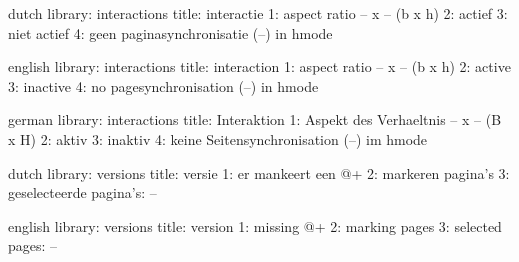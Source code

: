

\unprotect

\startmessages  dutch  library: interactions
  title: interactie
      1: aspect ratio -- x -- (b x h)
      2: actief
      3: niet actief
      4: geen paginasynchronisatie (--) in hmode
\stopmessages

\startmessages  english  library: interactions
  title: interaction
      1: aspect ratio -- x -- (b x h)
      2: active
      3: inactive
      4: no pagesynchronisation (--) in hmode
\stopmessages

\startmessages  german  library: interactions
  title: Interaktion
      1: Aspekt des Verhaeltnis -- x -- (B x H)
      2: aktiv
      3: inaktiv
      4: keine Seitensynchronisation (--) im hmode
\stopmessages

\startmessages  dutch  library: versions
  title: versie
      1: er mankeert een @+
      2: markeren pagina's
      3: geselecteerde pagina's: --
\stopmessages

\startmessages  english  library: versions
  title: version
      1: missing @+
      2: marking pages
      3: selected pages: --
\stopmessages

